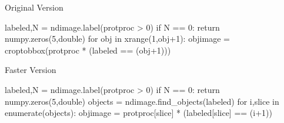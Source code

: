 \begin{frame}[fragile]

\begin{block}{Original Version}
\begin{python}
labeled,N = ndimage.label(protproc > 0)
if N == 0:
    return numpy.zeros(5,double)
for obj in xrange(1,obj+1):
    objimage = croptobbox(protproc * (labeled == (obj+1)))
\end{python}
\end{block}

\pause
\begin{block}{Faster Version}
\begin{python}
labeled,N = ndimage.label(protproc > 0)
if N == 0:
    return numpy.zeros(5,double)
objects = ndimage.find_objects(labeled)
for i,slice in enumerate(objects):
    objimage = protproc[slice] * (labeled[slice] == (i+1))
\end{python}
\end{block}
\end{frame}



